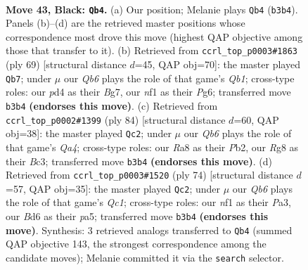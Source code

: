 \documentclass[11pt]{article}
\begin{document}
\clearpage

\begin{figure}[p]\centering
\begin{subfigure}{0.46\textwidth}\centering
\resizebox{\linewidth}{!}{%
\newchessgame
\chessboard[
  setfen={r5r1/p5pp/2kb4/3p2QP/p2P2PK/1q2P3/8/5N2 b - - 1 43},
  showmover=false,
  pgfstyle=straightmove, color=movearrow, markmove={b3-b4}
]}
\caption{}
\end{subfigure}\hfill
\begin{subfigure}{0.46\textwidth}\centering
\resizebox{\linewidth}{!}{%
\newchessgame
\chessboard[
  setfen={1q3rk1/5pb1/4p1p1/7p/2R1P2P/5QPN/5PK1/8 b - - 1 35},
  showmover=false,
  pgfstyle=straightmove, color=movearrow, markmove={b8-b7}
]}
\caption{}
\end{subfigure}
\\[4pt]
\begin{subfigure}{0.46\textwidth}\centering
\resizebox{\linewidth}{!}{%
\newchessgame
\chessboard[
  setfen={3r4/p5pk/1b3pqp/8/Q3R1P1/2B2P1P/1P4K1/8 w - - 9 43},
  showmover=false,
  pgfstyle=straightmove, color=movearrow, markmove={a4-c2}
]}
\caption{}
\end{subfigure}\hfill
\begin{subfigure}{0.46\textwidth}\centering
\resizebox{\linewidth}{!}{%
\newchessgame
\chessboard[
  setfen={8/5pk1/2r4p/p1Pq2p1/4p3/P1R3PP/5P2/2Q3K1 w - - 4 38},
  showmover=false,
  pgfstyle=straightmove, color=movearrow, markmove={c1-c2}
]}
\caption{}
\end{subfigure}
\caption{\textbf{Move 43, Black: \texttt{Qb4}.} (a) Our position; Melanie plays \texttt{Qb4} (\texttt{b3b4}). Panels (b)--(d) are the retrieved master positions whose correspondence most drove this move (highest QAP objective among those that transfer to it). (b) Retrieved from \texttt{ccrl\_top\_p0003\#1863} (ply 69) [structural distance $d$=45, QAP obj=70]: the master played \texttt{Qb7}; under $\mu$ our \emph{Qb6} plays the role of that game's \emph{Qb1}; cross-type roles: our \emph{p}d4 as their \emph{B}g7, our \emph{n}f1 as their \emph{P}g6; transferred move \texttt{b3b4} \textbf{(endorses this move)}. (c) Retrieved from \texttt{ccrl\_top\_p0002\#1399} (ply 84) [structural distance $d$=60, QAP obj=38]: the master played \texttt{Qc2}; under $\mu$ our \emph{Qb6} plays the role of that game's \emph{Qa4}; cross-type roles: our \emph{R}a8 as their \emph{P}b2, our \emph{R}g8 as their \emph{B}c3; transferred move \texttt{b3b4} \textbf{(endorses this move)}. (d) Retrieved from \texttt{ccrl\_top\_p0003\#1520} (ply 74) [structural distance $d$=57, QAP obj=35]: the master played \texttt{Qc2}; under $\mu$ our \emph{Qb6} plays the role of that game's \emph{Qc1}; cross-type roles: our \emph{n}f1 as their \emph{P}a3, our \emph{B}d6 as their \emph{p}a5; transferred move \texttt{b3b4} \textbf{(endorses this move)}. Synthesis: 3 retrieved analogs transferred to \texttt{Qb4} (summed QAP objective 143, the strongest correspondence among the candidate moves); Melanie committed it via the \texttt{search} selector.}
\label{fig:thought-m85}
\end{figure}
\end{document}

